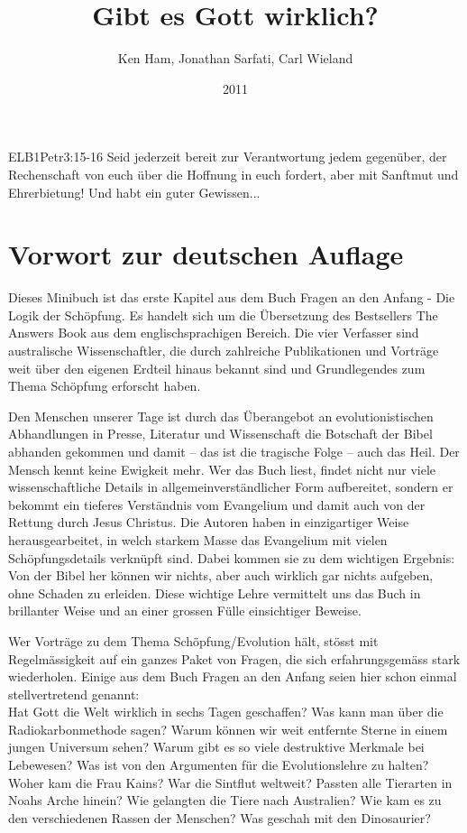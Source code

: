 \documentclass{../inc/mybib}
\title{Gibt es Gott wirklich?}
\author{Ken Ham, Jonathan Sarfati, Carl Wieland}
\date{2011}
\begin{document}
\maketitle
\begin{bibeltext}{ELB}{1Petr}{3:15-16}
    Seid jederzeit bereit zur Verantwortung jedem gegenüber, der Rechenschaft von euch über die Hoffnung in euch fordert, aber mit Sanftmut und Ehrerbietung! Und habt ein guter Gewissen...
\end{bibeltext}
\tableofcontents
\section{Vorwort zur deutschen Auflage}
Dieses Minibuch \cite{keith1} ist das erste Kapitel aus dem Buch \flqq Fragen an den Anfang - Die Logik der Schöpfung\frqq. Es handelt sich um die Übersetzung des Bestsellers \flqq The Answers Book\frqq{} aus dem englischsprachigen Bereich. Die vier Verfasser sind australische Wissenschaftler, die durch zahlreiche Publikationen und Vorträge weit über den eigenen Erdteil hinaus bekannt sind und Grundlegendes zum Thema Schöpfung erforscht haben.

Den Menschen unserer Tage ist durch das Überangebot an evolutionistischen Abhandlungen in Presse, Literatur und Wissenschaft die Botschaft der Bibel abhanden gekommen und damit -- das ist die tragische Folge -- auch das Heil. Der Mensch kennt keine Ewigkeit mehr. Wer das Buch liest, findet nicht nur viele wissenschaftliche Details in allgemeinverständlicher Form aufbereitet, sondern er bekommt ein tieferes Verständnis vom Evangelium und damit auch von der Rettung durch Jesus Christus. Die Autoren haben in einzigartiger Weise herausgearbeitet, in welch starkem Masse das Evangelium mit vielen Schöpfungsdetails verknüpft sind. Dabei kommen sie zu dem wichtigen Ergebnis: Von der Bibel her können wir nichts, aber auch wirklich gar nichts aufgeben, ohne Schaden zu erleiden. Diese wichtige Lehre vermittelt uns das Buch in brillanter Weise und an einer grossen Fülle einsichtiger Beweise.

Wer Vorträge zu dem Thema Schöpfung/Evolution hält, stösst mit Regelmässigkeit auf ein ganzes Paket von Fragen, die sich erfahrungsgemäss stark wiederholen. Einige aus dem Buch \flqq Fragen an den Anfang\frqq{} seien hier schon einmal stellvertretend genannt:\\
Hat Gott die Welt wirklich in sechs Tagen geschaffen? Was kann man über die Radiokarbonmethode sagen? Warum können wir weit entfernte Sterne in einem jungen Universum sehen? Warum gibt es so viele destruktive Merkmale bei Lebewesen? Was ist von den Argumenten für die Evolutionslehre zu halten? Woher kam die Frau Kains? War die Sintflut weltweit? Passten alle Tierarten in Noahs Arche hinein? Wie gelangten die Tiere nach Australien? Wie kam es zu den verschiedenen Rassen der Menschen? Was geschah mit den Dinosaurier?
\end{document}
